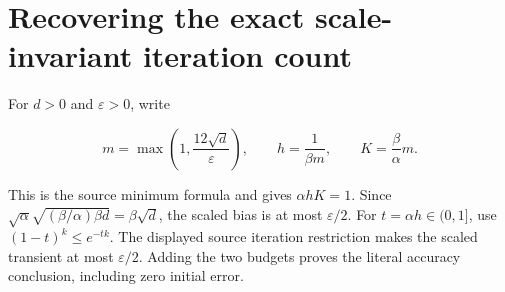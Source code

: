 \documentclass[11pt,a4paper]{report}
\begin{document}
\section{\texorpdfstring{Recovering the exact scale-invariant iteration count}{Recovering the exact scale-invariant iteration count}}


For \(d>0\) and \(\varepsilon>0\), write


    \[m=\max\left(1,\frac{12\sqrt d}{\varepsilon}\right),\qquad
    h=\frac1{\beta m},\qquad K=\frac\beta\alpha m.\]


This is the source minimum formula and gives \(\alpha hK=1\).
    Since
    \(\sqrt\alpha\sqrt{(\beta/\alpha)\beta d}=\beta\sqrt d\),
    the scaled bias is at most \(\varepsilon/2\).
    For \(t=\alpha h\in(0,1]\), use \((1-t)^k\le e^{-tk}\).
    The displayed source iteration restriction makes the scaled transient
    at most \(\varepsilon/2\). Adding the two budgets proves the
    literal accuracy conclusion, including zero initial error.
\end{document}
